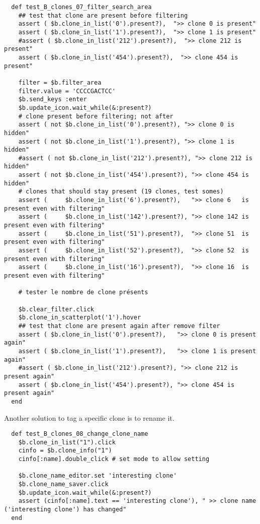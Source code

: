 \begin{verbatim}
  def test_B_clones_07_filter_search_area
    ## test that clone are present before filtering
    assert ( $b.clone_in_list('0').present?),  ">> clone 0 is present"
    assert ( $b.clone_in_list('1').present?),  ">> clone 1 is present"
    #assert ( $b.clone_in_list('212').present?),  ">> clone 212 is present"
    assert ( $b.clone_in_list('454').present?),  ">> clone 454 is present"

    filter = $b.filter_area
    filter.value = 'CCCCGACTCC'
    $b.send_keys :enter
    $b.update_icon.wait_while(&:present?)
    # clone present before filtering; not after
    assert ( not $b.clone_in_list('0').present?), ">> clone 0 is hidden"
    assert ( not $b.clone_in_list('1').present?), ">> clone 1 is hidden"
    #assert ( not $b.clone_in_list('212').present?), ">> clone 212 is hidden"
    assert ( not $b.clone_in_list('454').present?), ">> clone 454 is hidden"
    # clones that should stay present (19 clones, test somes)
    assert (     $b.clone_in_list('6').present?),   ">> clone 6   is present even with filtering"
    assert (     $b.clone_in_list('142').present?), ">> clone 142 is present even with filtering"
    assert (     $b.clone_in_list('51').present?),  ">> clone 51  is present even with filtering"
    assert (     $b.clone_in_list('52').present?),  ">> clone 52  is present even with filtering"
    assert (     $b.clone_in_list('16').present?),  ">> clone 16  is present even with filtering"

    # tester le nombre de clone présents

    $b.clear_filter.click
    $b.clone_in_scatterplot('1').hover
    ## test that clone are present again after remove filter
    assert ( $b.clone_in_list('0').present?),   ">> clone 0 is present again"
    assert ( $b.clone_in_list('1').present?),   ">> clone 1 is present again"
    #assert ( $b.clone_in_list('212').present?), ">> clone 212 is present again"
    assert ( $b.clone_in_list('454').present?), ">> clone 454 is present again"
  end
\end{verbatim}  
\bigskip

Another solution to tag a specific clone is to rename it.
\begin{verbatim}
  def test_B_clones_08_change_clone_name
    $b.clone_in_list("1").click
    cinfo = $b.clone_info("1")
    cinfo[:name].double_click # set mode to allow setting

    $b.clone_name_editor.set 'interesting clone'
    $b.clone_name_saver.click
    $b.update_icon.wait_while(&:present?)
    assert (cinfo[:name].text == 'interesting clone'), " >> clone name ('interesting clone') has changed"
  end
\end{verbatim}

